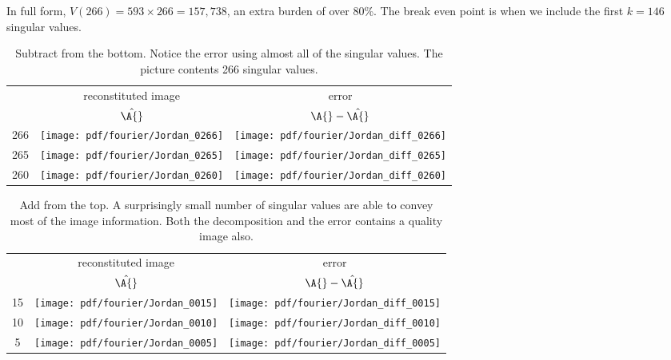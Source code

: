 In full form, $V(266) = 593\times266 = 157,738$, an extra burden of over 80\%. The break even point is when we include the first $k=146$ singular values.

\clearpage
\break

\begin{table}[htdp]
\begin{center}
\begin{tabular}{ccc}
 & reconstituted image & error \\
 & $\hat{\A{}}$ & $\A{} - \hat{\A{}}$ \\
266 & \texttt{[image: pdf/fourier/Jordan\_0266]} & \texttt{[image: pdf/fourier/Jordan\_diff\_0266]} \\
265 & \texttt{[image: pdf/fourier/Jordan\_0265]} & \texttt{[image: pdf/fourier/Jordan\_diff\_0265]}\\
260 & \texttt{[image: pdf/fourier/Jordan\_0260]} & \texttt{[image: pdf/fourier/Jordan\_diff\_0260]}\\
\end{tabular}
\end{center}
\label{default}
\caption[Subtract from the bottom]{Subtract from the bottom. Notice the error using almost all of the singular values. The picture contents 266 singular values.}
\end{table}%
\begin{table}[htdp]
\begin{center}
\begin{tabular}{ccc}
 & reconstituted image & error \\
 & $\hat{\A{}}$ & $\A{} - \hat{\A{}}$ \\
 15 & \texttt{[image: pdf/fourier/Jordan\_0015]} & \texttt{[image: pdf/fourier/Jordan\_diff\_0015]} \\
 10 & \texttt{[image: pdf/fourier/Jordan\_0010]} & \texttt{[image: pdf/fourier/Jordan\_diff\_0010]}\\
  5 & \texttt{[image: pdf/fourier/Jordan\_0005]} & \texttt{[image: pdf/fourier/Jordan\_diff\_0005]}\\
\end{tabular}
\end{center}
\label{default}
\caption[Add from the top]{Add from the top. A surprisingly small number of singular values are able to convey most of the image information. Both the decomposition and the error contains a quality image also.}
\end{table}%
